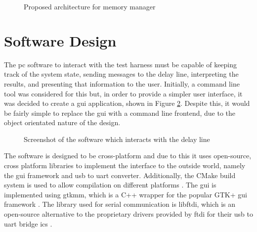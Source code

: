 \begin{figure}[ht]
	\caption{Proposed architecture for memory manager}
	\label{fig:mem-manager-arch}
\end{figure}

\section{Software Design}  \label{sec:test-harness-sw}

The \gls{pc} software to interact with the test harness must be capable of keeping track of the system state, sending messages to the delay line, interpreting the results, and presenting that information to the user. Initially, a command line tool was considered for this but, in order to provide a simpler user interface, it was decided to create a \gls{gui} application, shown in Figure \ref{fig:mem-gui-screenshot}. Despite this, it would be fairly simple to replace the \gls{gui} with a command line frontend, due to the object orientated nature of the design.

\begin{figure}[ht]
	\centering
	\caption{Screenshot of the software which interacts with the delay line}
	\label{fig:mem-gui-screenshot}
\end{figure}

The software is designed to be cross-platform and due to this it uses open-source, cross platform libraries to implement the interface to the outside world, namely the \gls{gui} framework and \gls{usb} to \gls{uart} converter. Additionally, the CMake build system is used to allow compilation on different platforms \cite{cmake2017}. The \gls{gui} is implemented using gtkmm, which is a C++ wrapper for the popular GTK+ \gls{gui} framework \cite{cumming2017}. The library used for serial communication is libftdi, which is an open-source alternative to the proprietary drivers provided by \gls{ftdi} for their \gls{usb} to \gls{uart} bridge \glspl{ic} \cite{intra2net2017}.

